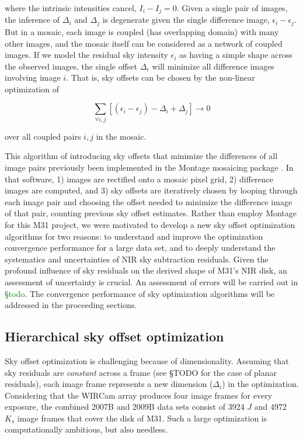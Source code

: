 \documentclass[iop]{emulateapj}
\newcommand{\todo}[1]{\textcolor{green}{#1}}
\begin{document}
\noindent where the intrinsic intensities cancel, $I_i - I_j = 0$. Given a single pair of images, the inference of $\Delta_i$ and $\Delta_j$ is degenerate given the single difference image, $\epsilon_i-\epsilon_j$. But in a mosaic, each image is coupled (has overlapping domain) with many other images, and the mosaic itself can be considered as a network of coupled images. If we model the residual sky intensity $\epsilon_i$ as having a simple shape across the observed images, the single offset $\Delta_i$ will minimize all difference images involving image $i$. That is, sky offsets can be chosen by the non-linear optimization of

\begin{equation}
    \sum_{\forall i,j} [(\epsilon_i - \epsilon_j) - \Delta_i + \Delta_j] \rightarrow 0
    \label{eq:scalartheoryobj}
\end{equation}

\noindent over all coupled pairs $i,j$ in the mosaic.

This algorithm of introducing sky offsets that minimize the differences of all image pairs previously been implemented in the Montage mosaicing package \citep{Berriman:2008}. In that software, 1) images are rectified onto a mosaic pixel grid, 2) difference images are computed, and 3) sky offsets are iteratively chosen by looping through each image pair and choosing the offset needed to minimize the difference image of that pair, counting previous sky offset estimates. Rather than employ Montage for this M31 project, we were motivated to develop a new sky offset optimization algorithms for two reasons: to understand and improve the optimization convergence performance for a large data set, and to deeply understand the systematics and uncertainties of NIR sky subtraction residuals. Given the profound influence of sky residuals on the derived shape of M31's NIR disk, an assessment of uncertainty is crucial. An assessment of errors will be carried out in \todo{\S todo}. The convergence performance of sky optimization algorithms will be addressed in the proceeding sections.

\subsection{Hierarchical sky offset optimization}

Sky offset optimization is challenging because of dimensionality. Assuming that sky residuals are \emph{constant} across a frame (see \S TODO for the case of planar residuals), each image frame represents a new dimension ($\Delta_i$) in the optimization. Considering that the WIRCam array produces four image frames for every exposure, the combined 2007B and 2009B data sets consist of 3924 $J$ and 4972 $K_s$ image frames that cover the disk of M31. Such a large optimization is computationally ambitious, but also needless.
\end{document}
